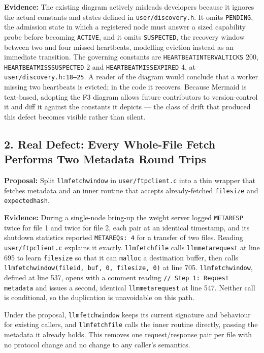 \documentclass[11pt]{article}
\renewcommand{\_}{\origunderscore\allowbreak}
\begin{document}
\textbf{Evidence:} The existing diagram actively misleads developers because it ignores the actual constants and states defined in \texttt{user/discovery.h}. It omits \texttt{PENDING}, the admission state in which a registered node must answer a sized capability probe before becoming \texttt{ACTIVE}, and it omits \texttt{SUSPECTED}, the recovery window between two and four missed heartbeats, modelling eviction instead as an immediate transition. The governing constants are \texttt{HEARTBEAT\_INTERVAL\_TICKS} 200, \texttt{HEARTBEAT\_MISS\_SUSPECTED} 2 and \texttt{HEARTBEAT\_MISS\_EXPIRED} 4, at \texttt{user/discovery.h:18--25}. A reader of the diagram would conclude that a worker missing two heartbeats is evicted; in the code it recovers. Because Mermaid is text-based, adopting the F3 diagram allows future contributors to version-control it and diff it against the constants it depicts --- the class of drift that produced this defect becomes visible rather than silent.

\subsection*{2. Real Defect: Every Whole-File Fetch Performs Two Metadata Round Trips}
\textbf{Proposal:} Split \texttt{llm\_fetch\_window} in \texttt{user/ftpclient.c} into a thin wrapper that fetches metadata and an inner routine that accepts already-fetched \texttt{file\_size} and \texttt{expected\_hash}.

\textbf{Evidence:} During a single-node bring-up the weight server logged \texttt{META\_RESP} twice for file 1 and twice for file 2, each pair at an identical timestamp, and its shutdown statistics reported \texttt{META\_REQs: 4} for a transfer of two files. Reading \texttt{user/ftpclient.c} explains it exactly. \texttt{llm\_fetch\_file} calls \texttt{llm\_meta\_request} at line 695 to learn \texttt{file\_size} so that it can \texttt{malloc} a destination buffer, then calls \texttt{llm\_fetch\_window(file\_id, buf, 0, file\_size, 0)} at line 705. \texttt{llm\_fetch\_window}, defined at line 537, opens with a comment reading \texttt{// Step 1: Request metadata} and issues a second, identical \texttt{llm\_meta\_request} at line 547. Neither call is conditional, so the duplication is unavoidable on this path.

Under the proposal, \texttt{llm\_fetch\_window} keeps its current signature and behaviour for existing callers, and \texttt{llm\_fetch\_file} calls the inner routine directly, passing the metadata it already holds. This removes one request/response pair per file with no protocol change and no change to any caller's semantics.
\end{document}
